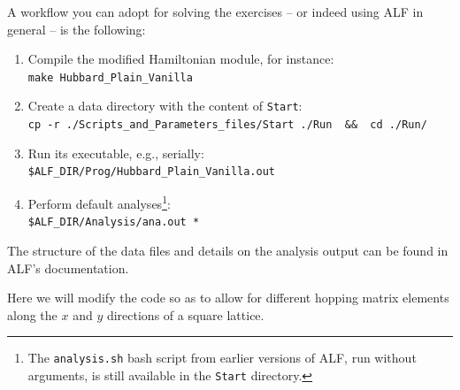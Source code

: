 \documentclass[10pt,modern]{scrartcl}
\numberwithin{exerciseitem}{exercise} %
\begin{document}
A workflow you can adopt for solving the exercises -- or indeed using ALF in general -- is the following:
\begin{enumerate}
	\item Compile the modified Hamiltonian module, for instance:\\
	\lstinline[style=bash,morekeywords={make}]{make Hubbard_Plain_Vanilla}
	\item Create a data directory with the content of \texttt{Start}:\\
	\lstinline[style=bash,morekeywords={cp}]{cp -r ./Scripts_and_Parameters_files/Start ./Run  &&  cd ./Run/}
	\item Run its executable, e.g., serially:\\
	\lstinline[style=bash]{$ALF_DIR/Prog/Hubbard_Plain_Vanilla.out} %
	\item Perform default analyses\footnote{The \texttt{analysis.sh} bash script from earlier versions of ALF, run without arguments, is still available in the \texttt{Start} directory.}:\\
	\lstinline[style=bash]{$ALF_DIR/Analysis/ana.out *} %
\end{enumerate}
The structure of the data files and details on the analysis output can be found in ALF's documentation.




Here we will modify the code  so as to allow  for different hopping matrix elements along the $x$ and $y$ directions of a square lattice.
\end{document}
